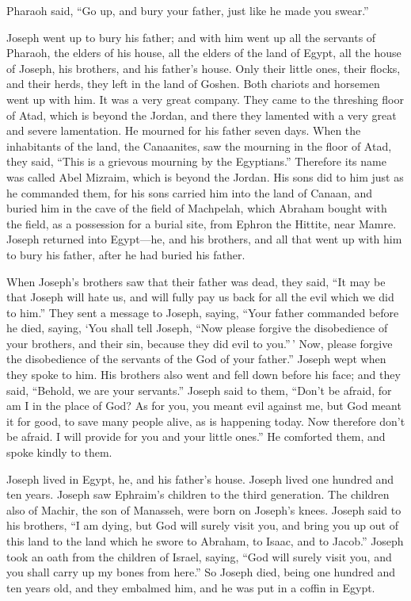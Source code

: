  Pharaoh said, ``Go up, and bury your father, just like he
made you swear.''

 Joseph went up to bury his father; and with him went up all
the servants of Pharaoh, the elders of his house, all the elders of the
land of Egypt,  all the house of Joseph, his brothers, and
his father's house. Only their little ones, their flocks, and their
herds, they left in the land of Goshen.  Both chariots and
horsemen went up with him. It was a very great company. 
They came to the threshing floor of Atad, which is beyond the Jordan,
and there they lamented with a very great and severe lamentation. He
mourned for his father seven days.  When the inhabitants of
the land, the Canaanites, saw the mourning in the floor of Atad, they
said, ``This is a grievous mourning by the Egyptians.'' Therefore its
name was called Abel Mizraim, which is beyond the Jordan. 
His sons did to him just as he commanded them,  for his
sons carried him into the land of Canaan, and buried him in the cave of
the field of Machpelah, which Abraham bought with the field, as a
possession for a burial site, from Ephron the Hittite, near Mamre.
 Joseph returned into Egypt---he, and his brothers, and all
that went up with him to bury his father, after he had buried his
father.

 When Joseph's brothers saw that their father was dead,
they said, ``It may be that Joseph will hate us, and will fully pay us
back for all the evil which we did to him.''  They sent a
message to Joseph, saying, ``Your father commanded before he died,
saying,  `You shall tell Joseph, ``Now please forgive the
disobedience of your brothers, and their sin, because they did evil to
you.''\,' Now, please forgive the disobedience of the servants of the
God of your father.'' Joseph wept when they spoke to him. 
His brothers also went and fell down before his face; and they said,
``Behold, we are your servants.''  Joseph said to them,
``Don't be afraid, for am I in the place of God?  As for
you, you meant evil against me, but God meant it for good, to save many
people alive, as is happening today.  Now therefore don't
be afraid. I will provide for you and your little ones.'' He comforted
them, and spoke kindly to them.

 Joseph lived in Egypt, he, and his father's house. Joseph
lived one hundred and ten years.  Joseph saw Ephraim's
children to the third generation. The children also of Machir, the son
of Manasseh, were born on Joseph's knees.  Joseph said to
his brothers, ``I am dying, but God will surely visit you, and bring you
up out of this land to the land which he swore to Abraham, to Isaac, and
to Jacob.''  Joseph took an oath from the children of
Israel, saying, ``God will surely visit you, and you shall carry up my
bones from here.''  So Joseph died, being one hundred and
ten years old, and they embalmed him, and he was put in a coffin in
Egypt.

